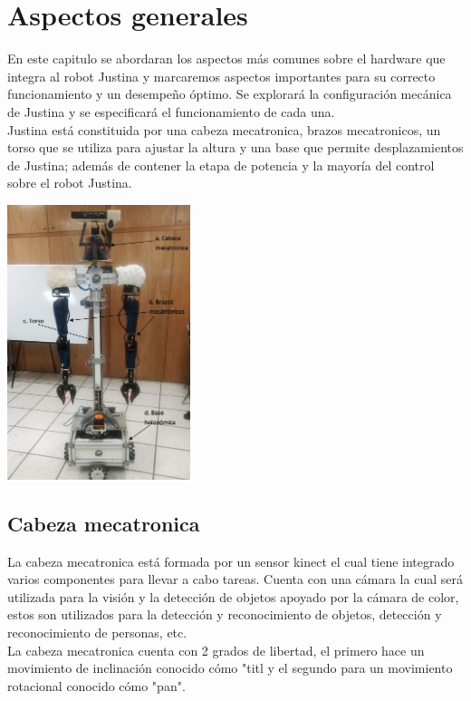 \documentclass[user_manual.tex]{subfiles}
\begin{document}
 \chapter{Aspectos generales}
En este capitulo se abordaran los aspectos más comunes sobre el hardware que integra al robot Justina y marcaremos aspectos importantes para su correcto funcionamiento y un desempeño óptimo. Se explorará la configuración mecánica de Justina y se especificará el funcionamiento de cada una.\\

Justina está constituida por una cabeza mecatronica, brazos mecatronicos, un torso que se utiliza para ajustar la altura y una base que permite desplazamientos de Justina; además de contener la etapa de potencia y la mayoría del control sobre el robot Justina.


\begin{center}
\includegraphics[width=0.4\textwidth]{Figures/Hardware/Diagramas/Cuerpo.png}
\label{fig:Hardware:Diagramas:Justina:Completa}
\end{center}
\section{Cabeza mecatronica}
 La cabeza mecatronica está formada por un sensor kinect el cual tiene integrado varios componentes para llevar a cabo tareas. Cuenta con una cámara la cual será utilizada para la visión y la detección de objetos apoyado por la cámara de color, estos son utilizados para la detección y reconocimiento de objetos, detección y reconocimiento de personas, etc.\\
 
 La cabeza mecatronica cuenta con 2 grados de libertad, el primero hace un movimiento de inclinación conocido cómo "titl y el segundo para un movimiento rotacional conocido cómo "pan".
\end{document}
